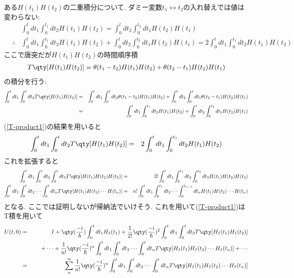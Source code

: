 \documentclass[10.5pt,a4paper]{jreport}
\begin{document}
ある$H(t_1)H(t_2)$の二重積分について. ダミー変数$t_1\leftrightarrow t_2$の入れ替えでは値は変わらない:
\begin{eqnarray}
  && \int_0^t dt_1\int_0^{t_1}dt_2H(t_1)H(t_2) = \int_0^t dt_2\int_0^{t_2}dt_1H(t_2)H(t_1)\\
  &\therefore& \int_0^t dt_1\int_0^{t_1}dt_2H(t_1)H(t_2) + \int_0^t dt_2\int_0^{t_2}dt_1H(t_2)H(t_1) = 2\int_0^t dt_1\int_0^{t_1}dt_2H(t_1)H(t_2)\label{T-product1}
\end{eqnarray}
ここで唐突だが$H(t_1)H(t_2)$の時間順序積
\begin{eqnarray}
  T\qty[H(t_1)H(t_2)] = \theta(t_1 - t_2)H(t_1)H(t_2) + \theta(t_2 - t_1)H(t_2)H(t_1)
\end{eqnarray}
の積分を行う:
\begin{eqnarray}
  \nonumber  \int_0^t dt_1\int_0^{t}dt_2 T\qty[H(t_1)H(t_2)] &=& \int_0^t dt_1\int_0^{t}dt_2\theta(t_1 - t_2)H(t_1)H(t_2) + \int_0^{t}dt_2\int_0^t dt_1\theta(t_2 - t_1)H(t_2)H(t_1)\\
  &=&\int_0^t dt_1\int_0^{t_1}dt_2H(t_1)H(t_2) + \int_0^{t}dt_2\int_0^{t_2} dt_1H(t_2)H(t_1)
\end{eqnarray}
(\ref{T-product1})の結果を用いると
\begin{eqnarray}
  \int_0^t dt_1\int_0^{t}dt_2 T\qty[H(t_1)H(t_2)] &=& 2\int_0^t dt_1\int_0^{t_1}dt_2H(t_1)H(t_2)
\end{eqnarray}
これを拡張すると
\begin{eqnarray}
  \int_0^t dt_1\int_0^{t}dt_2\int_0^{t}dt_3 T\qty[H(t_1)H(t_2)H(t_3)] &=& 3!\int_0^t dt_1\int_0^{t_1}dt_2\int_0^{t_2}dt_3H(t_1)H(t_2)H(t_3)\\
  \nonumber  \int_0^t dt_1\int_0^{t}dt_2\cdots\int_0^{t}dt_n T\qty[H(t_1)H(t_2)\cdots H(t_n)] &=& n!\int_0^t dt_1\int_0^{t_1}dt_2\cdots\int_0^{t_{n-1}}dt_nH(t_1)H(t_2)\cdots H(t_n)\\
\end{eqnarray}
となる. ここでは証明しないが帰納法でいけそう. これを用いて(\ref{T-product1})はT積を用いて
\begin{eqnarray}
  \nonumber  U(t, 0) &=& I + \qty(\frac{-i}{\hbar})\int_0^t dt_1 H_I(t_1) + \frac{1}{2!}\qty(\frac{-i}{\hbar})^2\int_0^t dt_1 \int_0^{t} dt_2 T\qty[H_I(t_1)H_I(t_2)]\\
  && \hspace{0.5cm}+ \cdots + \frac{1}{n!}\qty(\frac{-i}{\hbar})^n\int_0^t dt_1 \int_0^{t} dt_2\cdots\int_0^{t} dt_n T\qty[H_I(t_1)H_I(t_2)\cdots H_I(t_n)] + \cdots\\
  &=& \sum_{n}^\infty\frac{1}{n!}\qty(\frac{-i}{\hbar})^n\int_0^t dt_1 \int_0^{t} dt_2\cdots\int_0^{t} dt_n T\qty[H_I(t_1)H_I(t_2)\cdots H_I(t_n)]\label{T-product2}
\end{eqnarray}
\end{document}
